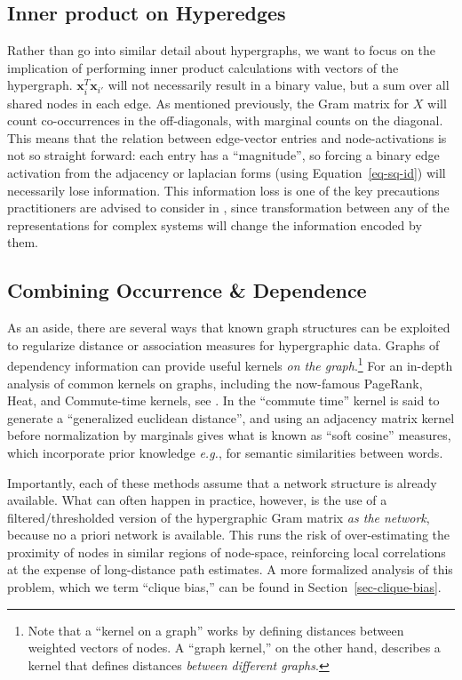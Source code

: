 \documentclass[%
	12pt,
		oneside,
		letterpaper
]{book}
\begin{document}
\subsection{Inner product on
Hyperedges}\label{inner-product-on-hyperedges}

Rather than go into similar detail about hypergraphs, we want to focus
on the implication of performing inner product calculations with vectors
of the hypergraph. \(\mathbf{x}_i^T\mathbf{x}_{i'}\) will not
necessarily result in a binary value, but a sum over all shared nodes in
each edge. As mentioned previously, the Gram matrix for \(X\) will count
co-occurrences in the off-diagonals, with marginal counts on the
diagonal. This means that the relation between edge-vector entries and
node-activations is not so straight forward: each entry has a
``magnitude'', so forcing a binary edge activation from the adjacency or
laplacian forms (using Equation~\ref{eq-sq-id}) will necessarily lose
information. This information loss is one of the key precautions
practitioners are advised to consider in
\textcite{WhyHowWhen_Torres2021}, since transformation between any of
the representations for complex systems will change the information
encoded by them.

\subsection{Combining Occurrence \&
Dependence}\label{combining-occurrence-dependence}

As an aside, there are several ways that known graph structures can be
exploited to regularize distance or association measures for
hypergraphic data. Graphs of dependency information can provide useful
kernels \emph{on the graph}.\footnote{ Note that a ``kernel on a graph''
  works by defining distances between weighted vectors of nodes. A
  ``graph kernel,'' on the other hand, describes a kernel that defines
  distances \emph{between different graphs}.} For an in-depth analysis
of common kernels on graphs, including the now-famous PageRank, Heat,
and Commute-time kernels, see
\textcite{SimilaritiesgraphsKernels_Avrachenkov2019}. In
\textcite{GeneralizedEuclideanmeasure_Coscia2020} the ``commute time''
kernel is said to generate a ``generalized euclidean distance'', and
using an adjacency matrix kernel before normalization by marginals gives
what is known as ``soft cosine'' measures, which incorporate prior
knowledge \emph{e.g.}, for semantic similarities between words.

Importantly, each of these methods assume that a network structure is
already available. What can often happen in practice, however, is the
use of a filtered/thresholded version of the hypergraphic Gram matrix
\emph{as the network}, because no a priori network is available. This
runs the risk of over-estimating the proximity of nodes in similar
regions of node-space, reinforcing local correlations at the expense of
long-distance path estimates. A more formalized analysis of this
problem, which we term ``clique bias,'' can be found in
Section~\ref{sec-clique-bias}.
\end{document}
